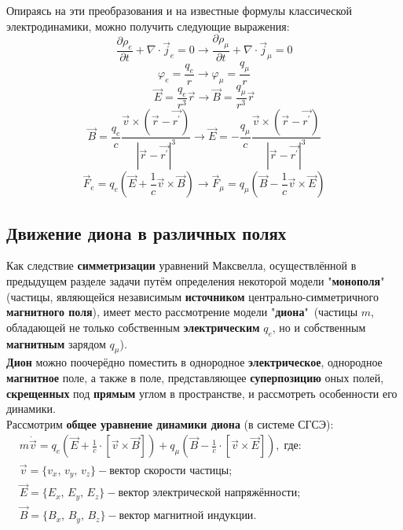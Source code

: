 \documentclass[oneside,final,14pt]{extarticle}
\begin{document}
	Опираясь на эти преобразования и на известные формулы классической электродинамики, можно получить следующие выражения:
	$$\frac{\partial \rho_{e}}{\partial t}+\nabla\cdot\vec j_{e}=0 \rightarrow \frac{\partial \rho_{\mu}}{\partial t}+\nabla\cdot\vec j_{\mu}=0$$
	$$\varphi_{e} = \frac{q_{e}}{r} \rightarrow \varphi_{\mu} = \frac{q_{\mu}}{r} $$
	$$\vec E = \frac{q_{e}}{r^3}\vec r \rightarrow \vec B = \frac{q_{\mu}}{r^3}\vec r$$
	$$\vec B=\frac{q_{e}}{c}\frac{\vec v \times(\vec r - \vec{ r^\prime})}{|\vec r - \vec {r^\prime}|^3} \rightarrow \vec E=-\frac{q_{\mu}}{c}\frac{\vec v \times(\vec r - \vec{ r^\prime})}{|\vec r - \vec {r^\prime}|^3}$$
	$$\vec F_{e}=q_{e}(\vec E + \frac{1}{c}\vec v \times \vec B) \rightarrow \vec F_{\mu}=q_{\mu}(\vec B - \frac{1}{c}\vec v \times \vec E)$$
	
	\newpage
	\subsection{Движение диона в различных полях}
	\noindent Как следствие \textbf{симметризации} уравнений Максвелла, осуществлённой в предыдущем разделе задачи путём определения некоторой модели "\textbf{монополя}"\, (частицы, являющейся независимым \textbf{источником} центрально-симметричного \textbf{магнитного поля}), имеет место рассмотрение модели "\textbf{диона}"\, (частицы $m$, обладающей не только собственным \textbf{электрическим} $q_{e}$, но и собственным \textbf{магнитным} зарядом $q_{\mu}$). \\
	
	\noindent \textbf{Дион} можно поочерёдно поместить в однородное \textbf{электрическое}, однородное \textbf{магнитное} поле, а также в поле, представляющее \textbf{суперпозицию} оных полей, \textbf{скрещенных} под \textbf{прямым} углом в пространстве, и рассмотреть особенности его динамики. \\
	
	\noindent Рассмотрим \textbf{общее уравнение динамики диона} (в системе СГСЭ): \\
	
	\begin{math}
		\begin{aligned}
			& m\dot{\vec{v}} = q_{e}\left(\vec{E} + \frac{1}{c} \cdot \left[\vec{v} \times \vec{B}\right]\right) + q_{\mu}\left(\vec{B} - \frac{1}{c} \cdot \left[\vec{v} \times \vec{E}\right]\right),\; \text{где:} \\
			& \vec{v} = \{v_{x},\, v_{y},\, v_{z}\} - \text{вектор скорости частицы}; \\
			& \vec{E} = \{E_{x},\, E_{y},\, E_{z}\} - \text{вектор электрической напряжённости}; \\
			& \vec{B} = \{B_{x},\, B_{y},\, B_{z}\} - \text{вектор магнитной индукции}.
		\end{aligned}
	\end{math} \\\\
	
\end{document}

